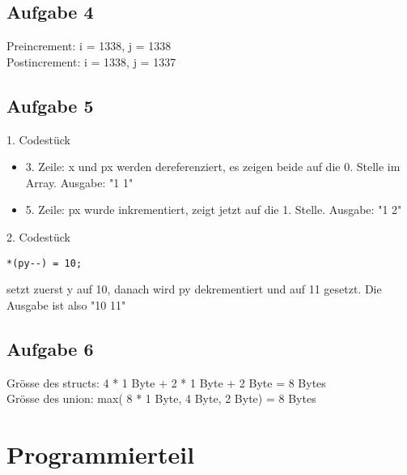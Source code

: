 \documentclass[a4paper]{scrartcl}
\begin{document}
\subsection{Aufgabe 4}
Preincrement: i = 1338, j = 1338 \\
Postincrement: i = 1338, j = 1337

\subsection{Aufgabe 5}
1. Codestück
\begin{itemize}
	\item 3. Zeile: x und px werden dereferenziert, es zeigen beide auf die 0. Stelle im Array. Ausgabe: "1 1"
	\item 5. Zeile: px wurde inkrementiert, zeigt jetzt auf die 1. Stelle. Ausgabe: "1 2"
\end{itemize}


2. Codestück
\begin{verbatim}
*(py--) = 10;
\end{verbatim} setzt zuerst y auf 10, danach wird py dekrementiert und auf 11 gesetzt. Die Ausgabe ist also "10 11"

\subsection{Aufgabe 6}
Grösse des structs: 4 * 1 Byte + 2 * 1 Byte + 2 Byte = 8 Bytes \\
Grösse des union: max( 8 * 1 Byte, 4 Byte, 2 Byte) = 8 Bytes

\section{Programmierteil}

\end{document}
